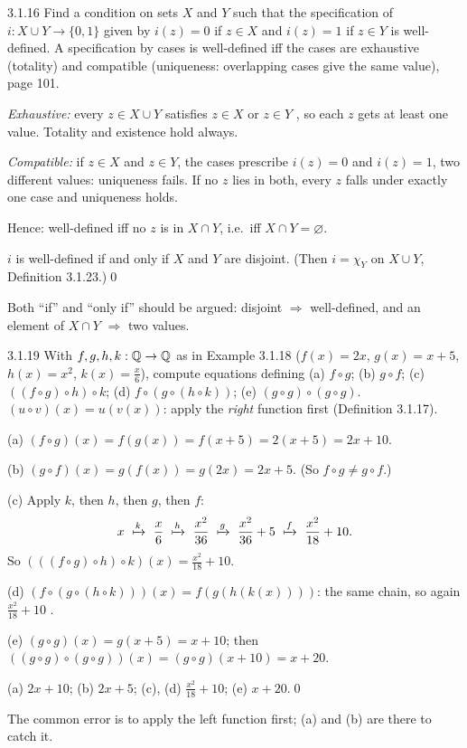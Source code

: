 \begin{bookex}[recommended]{3.1.16}
Find a condition on sets $X$ and $Y$ such that the specification of $i:X\cup Y\to\{0,1\}$ given by $i(z)=0$ if $z\in X$ and $i(z)=1$ if $z\in Y$ is well-defined.
\solution
\given A specification by cases is well-defined iff the cases are exhaustive (totality) and compatible (uniqueness: overlapping cases give the same value), page 101.
\begin{steps}
\item \emph{Exhaustive:} every $z\in X\cup Y$ satisfies $z\in X$ or $z\in Y$ , so each $z$ gets at least one value. Totality and existence hold always.
\item \emph{Compatible:} if $z\in X$ and $z\in Y$, the cases prescribe $i(z)=0$ and $i(z)=1$, two different values: uniqueness fails. If no $z$ lies in both, every $z$ falls under exactly one case and uniqueness holds.
\item Hence: well-defined iff no $z$ is in $X\cap Y$, i.e.\ iff $X\cap Y=\varnothing$.
\end{steps}
\answer $i$ is well-defined if and only if $X$ and $Y$ are disjoint. (Then $i=\chi_Y$ on $X\cup Y$, Definition 3.1.23.)\qed
\begin{compare}
\item Both ``if'' and ``only if'' should be argued: disjoint $\Rightarrow$ well-defined, and an element of $X\cap Y$ $\Rightarrow$ two values.
\end{compare}
\end{bookex}

\begin{bookex}[recommended]{3.1.19}
With $f,g,h,k:\mathbb{Q}\to\mathbb{Q}$ as in Example 3.1.18 ($f(x)=2x$, $g(x)=x+5$, $h(x)=x^2$, $k(x)=\frac x6$), compute equations defining (a) $f\circ g$; (b) $g\circ f$; (c) $((f\circ g)\circ h)\circ k$; (d) $f\circ(g\circ(h\circ k))$; (e) $(g\circ g)\circ(g\circ g)$.
\solution
\given $(u\circ v)(x)=u(v(x))$: apply the \emph{right} function first (Definition 3.1.17).
\begin{steps}
\item (a) $(f\circ g)(x)=f(g(x))=f(x+5)=2(x+5)=2x+10$.
\item (b) $(g\circ f)(x)=g(f(x))=g(2x)=2x+5$. (So $f\circ g\ne g\circ f$.)
\item (c) Apply $k$, then $h$, then $g$, then $f$:
\[
x\ \xmapsto{k}\ \frac x6\ \xmapsto{h}\ \frac{x^2}{36}\ \xmapsto{g}\ \frac{x^2}{36}+5\ \xmapsto{f}\ \frac{x^2}{18}+10 .
\]
So $(((f\circ g)\circ h)\circ k)(x)=\frac{x^2}{18}+10$.
\item (d) $(f\circ(g\circ(h\circ k)))(x)=f(g(h(k(x))))$: the same chain, so again $\frac{x^2}{18}+10$ .
\item (e) $(g\circ g)(x)=g(x+5)=x+10$; then $((g\circ g)\circ(g\circ g))(x)=(g\circ g)(x+10)=x+20$.
\end{steps}
\answer (a) $2x+10$; (b) $2x+5$; (c), (d) $\frac{x^2}{18}+10$; (e) $x+20$.\qed
\begin{compare}
\item The common error is to apply the left function first; (a) and (b) are there to catch it.
\end{compare}
\end{bookex}

